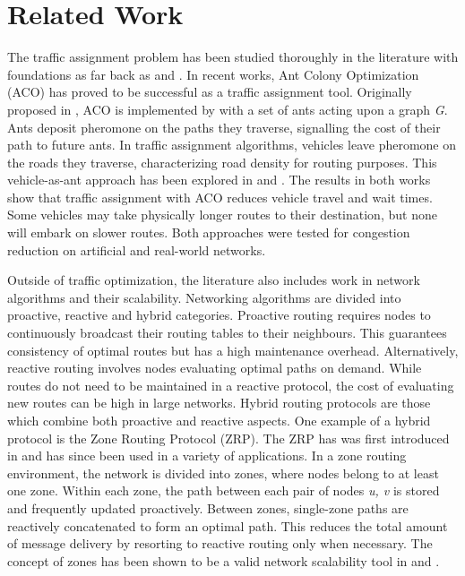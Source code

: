 \documentclass[conference]{IEEEtran}
\begin{document}
\section{Related Work}

The traffic assignment problem has been studied thoroughly in the literature with foundations as far back as \cite{knight} and \cite{wardrop}. In recent works, Ant Colony Optimization (ACO) has proved to be successful as a traffic assignment tool. Originally proposed in \cite{dorigo}, ACO is implemented by with a set of ants acting upon a graph \textit{G}. Ants deposit pheromone on the paths they traverse, signalling the cost of their path to future ants. In traffic assignment algorithms, vehicles leave pheromone on the roads they traverse, characterizing road density for routing purposes. This vehicle-as-ant approach has been explored in \cite{iaco} and \cite{dtpos}. The results in both works show that traffic assignment with ACO reduces vehicle travel and wait times. Some vehicles may take physically longer routes to their destination, but none will embark on slower routes. Both approaches were tested for congestion reduction on artificial and real-world networks.

Outside of traffic optimization, the literature also includes work in network algorithms and their scalability. Networking algorithms are divided into proactive, reactive and hybrid categories. Proactive routing requires nodes to continuously broadcast their routing tables to their neighbours. This guarantees consistency of optimal routes but has a high maintenance overhead. Alternatively, reactive routing involves nodes evaluating optimal paths on demand. While routes do not need to be maintained in a reactive protocol, the cost of evaluating new routes can be high in large networks. Hybrid routing protocols are those which combine both proactive and reactive aspects. One example of a hybrid protocol is the Zone Routing Protocol (ZRP). The ZRP has was first introduced in \cite{zrp} and has since been used in a variety of applications. In a zone routing environment, the network is divided into zones, where nodes belong to at least one zone. Within each zone, the path between each pair of nodes \textit{u, v} is stored and frequently updated proactively. Between zones, single-zone paths are reactively concatenated to form an optimal path. This reduces the total amount of message delivery by resorting to reactive routing only when necessary. The concept of zones has been shown to be a valid network scalability tool in \cite{hopnet} and \cite{mazacornet}.
\end{document}
